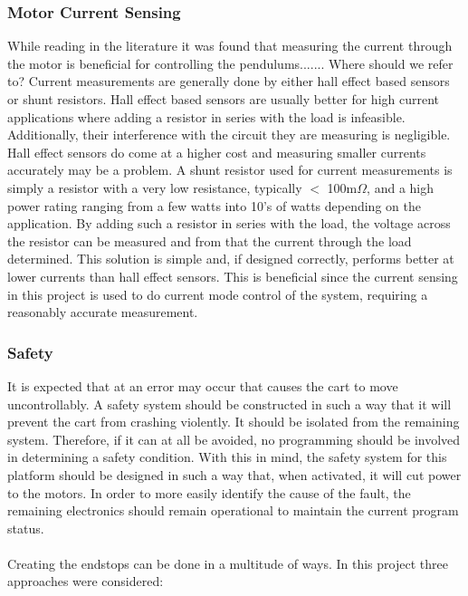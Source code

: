 \subsubsection{Motor Current Sensing}

While reading in the literature it was found that measuring the current through the motor is beneficial for controlling the pendulums....... Where should we refer to?
Current measurements are generally done by either hall effect based sensors or shunt resistors. 
Hall effect based sensors are usually better for high current applications where adding a resistor in series with the load is infeasible. 
Additionally, their interference with the circuit they are measuring is negligible.
Hall effect sensors do come at a higher cost and measuring smaller currents accurately may be a problem.
A shunt resistor used for current measurements is simply a resistor with a very low resistance, typically $<$ 100m$\Omega$, and a high power rating ranging from a few watts into 10's of watts depending on the application.
By adding such a resistor in series with the load, the voltage across the resistor can be measured and from that the current through the load determined.
This solution is simple and, if designed correctly, performs better at lower currents than hall effect sensors.
This is beneficial since the current sensing in this project is used to do current mode control of the system, requiring a reasonably accurate measurement.


\subsubsection{Safety} %
\label{subsub:safety}
It is expected that at an error may occur that causes the cart to move uncontrollably.
A safety system should be constructed in such a way that it will prevent the cart from crashing violently.
It should be isolated from the remaining system.
Therefore, if it can at all be avoided, no programming should be involved in determining a safety condition.
With this in mind, the safety system for this platform should be designed in such a way that, when activated, it will cut power to the motors.
In order to more easily identify the cause of the fault, the remaining electronics should remain operational to maintain the current program status.
\\~\\
Creating the endstops can be done in a multitude of ways.
In this project three approaches were considered:
